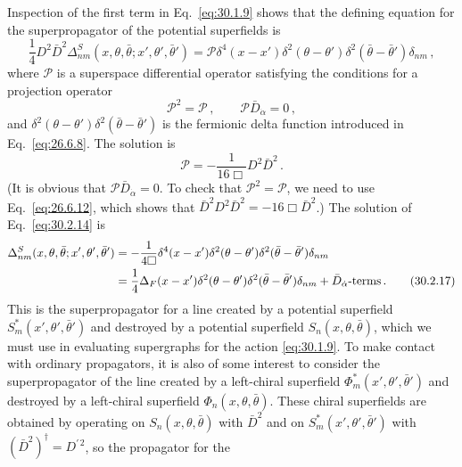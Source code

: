 Inspection of the first term in Eq.~\eqref{eq:30.1.9} shows that the
defining equation for the superpropagator of the potential superfields is
\begin{equation}
  \frac14D^2\bar D^2
  \Delta^S_{nm}(x,\theta,\bar\theta;x',\theta',\bar\theta')
  =\mathcal{P}\delta^4(x-x')\delta^2(\theta-\theta')
    \delta^2(\bar\theta-\bar\theta')\delta_{nm}\,,
  \tag{30.2.14}\label{eq:30.2.14}
\end{equation}
where \(\mathcal{P}\) is a superspace differential operator satisfying the
conditions for a projection operator
\begin{equation}
  \mathcal{P}^2=\mathcal{P}\,,
  \qquad
  \mathcal{P}\bar D_{\dot\alpha}=0\,,
  \tag{30.2.15}\label{eq:30.2.15}
\end{equation}
and
\(\delta^2(\theta-\theta')\delta^2(\bar\theta-\bar\theta')\)
is the fermionic delta function introduced in Eq.~\eqref{eq:26.6.8}.
The solution is
\begin{equation}
  \mathcal{P}=-\frac{1}{16\Box}D^2\bar D^2\,.
  \tag{30.2.16}\label{eq:30.2.16}
\end{equation}
(It is obvious that \(\mathcal{P}\bar D_{\dot\alpha}=0\). To check that
\(\mathcal{P}^2=\mathcal{P}\), we need to use Eq.~\eqref{eq:26.6.12}, which
shows that
\(\bar D^2D^2\bar D^2=-16\Box\bar D^2\).) The solution of
Eq.~\eqref{eq:30.2.14} is
\begin{align}
  \Delta^S_{nm}(x,\theta,\bar\theta;x',\theta',\bar\theta')
  &=-\frac{1}{4\Box}
    \delta^4(x-x')\delta^2(\theta-\theta')
    \delta^2(\bar\theta-\bar\theta')\delta_{nm}
  \notag\\
  &=\frac14\Delta_F(x-x')\delta^2(\theta-\theta')
    \delta^2(\bar\theta-\bar\theta')\delta_{nm}
    +\bar D_{\dot\alpha}\text{-terms}\,.
  \tag{30.2.17}\label{eq:30.2.17}
\end{align}
This is the superpropagator for a line created by a potential superfield
\(S_m^*(x',\theta',\bar\theta')\) and destroyed by a potential
superfield \(S_n(x,\theta,\bar\theta)\), which we must use in evaluating
supergraphs for the action
\eqref{eq:30.1.9}. To make contact with ordinary propagators, it is also of
some interest to consider the superpropagator of the line created by a
left-chiral superfield
\(\Phi_m^*(x',\theta',\bar\theta')\) and destroyed by a
left-chiral superfield \(\Phi_n(x,\theta,\bar\theta)\). These chiral
superfields are obtained by operating on
\(S_n(x,\theta,\bar\theta)\) with \(\bar D^2\) and on
\(S_m^*(x',\theta',\bar\theta')\) with
\((\bar D^2)^\dagger=D^{\prime\,2}\), so the propagator for the
